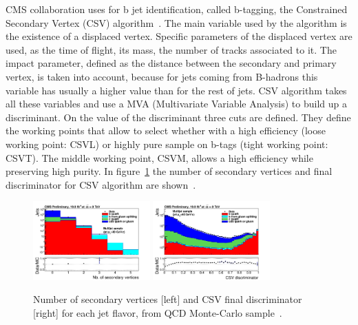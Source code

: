 %
CMS collaboration uses for b jet identification, called b-tagging, the Constrained Secondary Vertex (CSV) algorithm~\cite{Chatrchyan:2012jua, CMS-PAS-BTV-13-001}. The main variable used by the algorithm is the existence of a displaced vertex. Specific parameters of the displaced vertex are used, as the time of flight, its mass, the number of tracks associated to it. The impact parameter, defined as the distance between the secondary and primary vertex, is taken into account, because for jets coming from B-hadrons this variable has usually a higher value than for the rest of jets. CSV algorithm takes all these variables and use a MVA (Multivariate Variable Analysis) to build up a discriminant. On the value of the discriminant three cuts are defined. They define the working points that allow to select whether with a high efficiency (loose working point: CSVL) or highly pure sample on b-tags (tight working point: CSVT). The middle working point, CSVM, allows a high efficiency while preserving high purity. In figure~\ref{fig:CSVVar} the number of secondary vertices and final discriminator for CSV algorithm are shown~\cite{CMS-PAS-BTV-13-001}.

\begin{figure}[!Hhtbp]
  \begin{center}
    \includegraphics[width=0.4\textwidth]{figs/sv_multi_0_Log.png}
    \includegraphics[width=0.4\textwidth]{figs/pdf-sub.png}
    \caption{Number of secondary vertices [left] and CSV final discriminator [right] for each jet flavor, from QCD Monte-Carlo sample~\cite{CMS-PAS-BTV-13-001}.}
    \label{fig:CSVVar}
  \end{center}
\end{figure}

